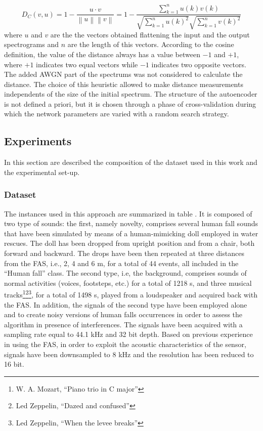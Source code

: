 \begin{equation}
D_C(v,u)=1-\frac{u\cdot v}{\left\|u \right\|\left\|v \right\| }= 1- \frac{\sum_{k=1}^{n}u(k)v(k)}{\sqrt{\sum_{k=1}^{n}u(k)^2}\sqrt{\sum_{k=1}^{n}v(k)^2}}
\end{equation}
where $u$ and $v$ are the the vectors obtained flattening the input and the output spectrograms and $n$ are the length of this vectors. 
According to the cosine definition, the value of the distance always has a value between $-1$ and $+1$, where $+1$ indicates two equal vectors while $-1$ indicates two opposite vectors.
The added AWGN part of the spectrums was not considered to calculate the distance. The choice of this heuristic allowed to make distance measurements independents of the size of the initial spectrum.
The structure of the autoencoder is not defined a priori, but it is chosen through a phase of cross-validation during which the network parameters are varied with a random search strategy.

\subsection{Experiments}
\label{sec:endtoend_experiments}
In this section are described the composition of the dataset used in this work and the experimental set-up.

\subsubsection{Dataset} 

The instances used in this approach are summarized in table .
It is composed of two type of sounds: the first, namely novelty, comprises several human fall sounds that have been simulated by means of a human-mimicking doll employed in water rescues. The doll has been dropped from upright position and from a chair, both forward and backward. The drops have been then repeated at three distances from the FAS, i.e., 2, 4 and 6 m, for a total of 44 events, all included in the “Human fall” class. The second type, i.e, the background, comprises sounds of normal activities (voices, footsteps, etc.) for a total of 1218 s, and three musical tracks\footnote{W. A. Mozart, ``Piano trio in C major''}\footnote{Led Zeppelin, ``Dazed and confused''}\footnote{Led Zeppelin, ``When the levee breaks''}, for a total of 1498 s, played from a loudspeaker and acquired back with the FAS.
In addition, the signals of the second type have been employed alone and to create noisy versions of human falls occurrences in order to assess the algorithm in presence of interferences.
The signals have been acquired with a sampling rate equal to 44.1 kHz and 32 bit depth. Based on previous experience in using the FAS, in order to exploit the acoustic characteristics of the sensor, signals have been downsampled to 8 kHz and the resolution has been reduced to 16 bit.


